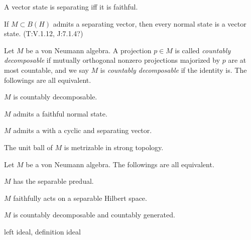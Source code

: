 \documentclass{../../large}
\begin{document}
A vector state is separating iff it is faithful.

If $M\subset B(H)$ admits a separating vector, then every normal state is a vector state. (T:V.1.12, J:7.1.4?)



\begin{prb}
Let $M$ be a von Neumann algebra.
A projection $p\in M$ is called \emph{countably decomposable} if mutually orthogonal nonzero projections majorized by $p$ are at most countable, and we say $M$ is \emph{countably decomposable} if the identity is.
The followings are all equivalent.
\begin{parts}
\item $M$ is countably decomposable.
\item $M$ admits a faithful normal state.
\item $M$ admits a  with a cyclic and separating vector.
\item The unit ball of $M$ is metrizable in strong topology.
\end{parts}
\end{prb}
\begin{pf}


\end{pf}

\begin{prb}
Let $M$ be a von Neumann algebra.
The followings are all equivalent.
\begin{parts}
\item $M$ has the separable predual.
\item $M$ faithfully acts on a separable Hilbert space.
\item $M$ is countably decomposable and countably generated.
\end{parts}
\end{prb}
\begin{pf}

\end{pf}








\begin{prb}
left ideal, definition ideal
\end{prb}
\end{document}
